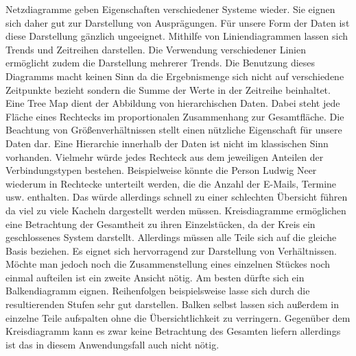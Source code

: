 Netzdiagramme geben Eigenschaften verschiedener Systeme wieder. Sie eignen sich daher gut zur Darstellung von Ausprägungen. Für unsere Form der Daten ist diese Darstellung gänzlich ungeeignet. Mithilfe von Liniendiagrammen lassen sich Trends und Zeitreihen darstellen. Die Verwendung verschiedener Linien ermöglicht zudem die Darstellung mehrerer Trends. Die Benutzung dieses Diagramms macht keinen Sinn da die Ergebnismenge sich nicht auf verschiedene Zeitpunkte bezieht sondern die Summe der Werte in der Zeitreihe beinhaltet. Eine Tree Map dient der Abbildung von hierarchischen Daten. Dabei steht jede Fläche eines Rechtecks im proportionalen Zusammenhang zur Gesamtfläche. Die Beachtung von Größenverhältnissen stellt einen nützliche Eigenschaft für unsere Daten dar. Eine Hierarchie innerhalb der Daten ist nicht im klassischen Sinn vorhanden. Vielmehr würde jedes Rechteck aus dem jeweiligen Anteilen der Verbindungstypen bestehen. Beispielweise könnte die Person Ludwig Neer wiederum in Rechtecke unterteilt werden, die die Anzahl der E-Mails, Termine usw. enthalten. Das würde allerdings schnell zu einer schlechten Übersicht führen da viel zu viele Kacheln dargestellt werden müssen. Kreisdiagramme ermöglichen eine Betrachtung der Gesamtheit zu ihren Einzelstücken, da der Kreis ein geschlossenes System darstellt. Allerdings müssen alle Teile sich auf die gleiche Basis beziehen. Es eignet sich hervorragend zur Darstellung von Verhältnissen. Möchte man jedoch noch die Zusammenstellung eines einzelnen Stückes noch einmal aufteilen ist ein zweite Ansicht nötig. Am besten dürfte sich ein Balkendiagramm eignen. Reihenfolgen beispielsweise lasse sich durch die resultierenden Stufen sehr gut darstellen. Balken selbst lassen sich außerdem in einzelne Teile aufspalten ohne die Übersichtlichkeit zu verringern. Gegenüber dem Kreisdiagramm kann es zwar keine Betrachtung des Gesamten liefern allerdings ist das in diesem Anwendungsfall auch nicht nötig. 